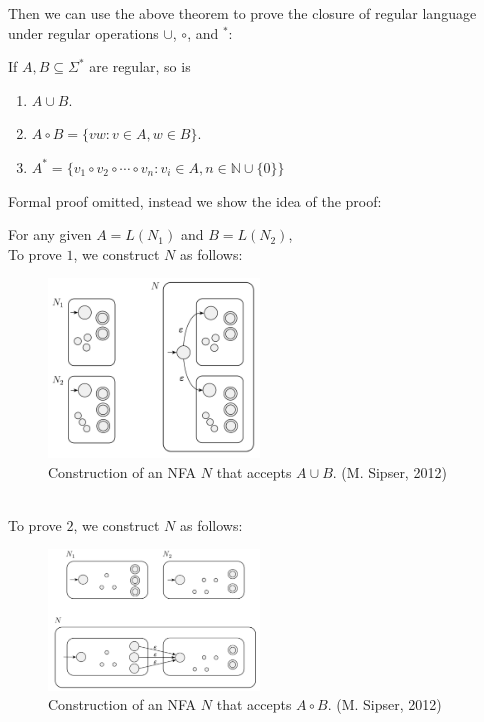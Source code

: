 \newpage 
Then we can use the above theorem to prove the closure of regular language under regular operations $\cup$, $\circ$, and $^{*}$:
\begin{lemma} If $A,B \subseteq \Sigma^{*}$ are regular, so is
    \begin{enumerate}
        \item $A \cup B$.
        \item $A \circ B = \{ vw : v \in A, w \in B\}$.
        \item $A^{*} = \{ v_1\circ v_2\circ \cdots\circ v_n : v_i \in A, n \in \mathbb{N}\cup \{ 0 \}\}$
    \end{enumerate}
\end{lemma}
Formal proof omitted, instead we show the idea of the proof:
\begin{proofidea}
For any given $A = L(N_1)$ and $B = L(N_2)$, 
\\ To prove $1$, we construct $N$ as follows:
\begin{figure}[htbp] \centering
    \includegraphics[width=0.5\textwidth]{figures/1.PNG}
    \caption{\label{fig:figure/1.PNG}
        Construction of an NFA $N$ that accepts $A \cup B$. (M. Sipser, 2012)
    }
\end{figure}
\\ To prove $2$, we construct $N$ as follows:
\begin{figure}[htbp] \centering
    \includegraphics[width=0.5\textwidth]{figures/2.PNG}
    \caption{\label{fig:figure/1.PNG}
        Construction of an NFA $N$ that accepts $A \circ B$. (M. Sipser, 2012)
}
\end{figure}
\end{proofidea}
